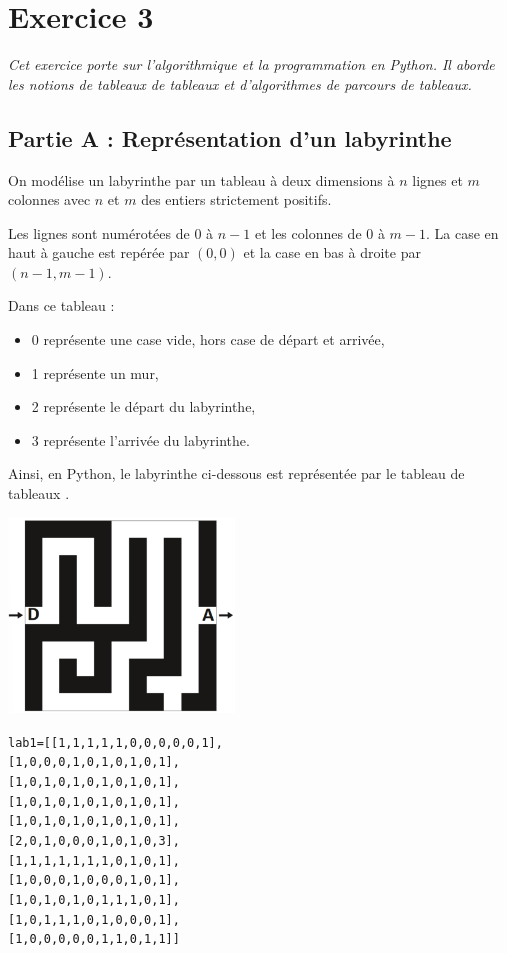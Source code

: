 \documentclass[11pt,a4paper,french,twoside]{PMCours}
\begin{document}
\newpage
\section*{Exercice 3}
\emph{Cet exercice porte sur l'algorithmique et la programmation en Python. Il aborde les notions
de tableaux de tableaux et d'algorithmes de parcours de tableaux.}

\subsection*{Partie A : Représentation d'un labyrinthe}
On modélise un labyrinthe par un tableau à deux dimensions à $n$ lignes et $m$ colonnes avec $n$ et
$m$ des entiers strictement positifs.

Les lignes sont numérotées de $0$ à $n-1$ et les colonnes de $0$ à $m-1$.
La case en haut à gauche est repérée par $(0,0)$ et la case en bas à droite par $(n-1,m-1)$.

Dans ce tableau :
\begin{itemize}
\item 0 représente une case vide, hors case de départ et arrivée,
\item 1 représente un mur,
\item 2 représente le départ du labyrinthe,
\item 3 représente l'arrivée du labyrinthe.
\end{itemize}
Ainsi, en Python, le labyrinthe ci-dessous est représentée par le tableau de tableaux .

\begin{multicols}{2}
\includegraphics[width=6cm]{BacBlanc2Sujet1_NSI2122-img1.png}

\begin{alltt}
lab1 = [[1, 1, 1, 1, 1, 0, 0, 0, 0, 0, 1],
        [1, 0, 0, 0, 1, 0, 1, 0, 1, 0, 1],
        [1, 0, 1, 0, 1, 0, 1, 0, 1, 0, 1],
        [1, 0, 1, 0, 1, 0, 1, 0, 1, 0, 1],
        [1, 0, 1, 0, 1, 0, 1, 0, 1, 0, 1],
        [2, 0, 1, 0, 0, 0, 1, 0, 1, 0, 3],
        [1, 1, 1, 1, 1, 1, 1, 0, 1, 0, 1],
        [1, 0, 0, 0, 1, 0, 0, 0, 1, 0, 1],
        [1, 0, 1, 0, 1, 0, 1, 1, 1, 0, 1],
        [1, 0, 1, 1, 1, 0, 1, 0, 0, 0, 1],
        [1, 0, 0, 0, 0, 0, 1, 1, 0, 1, 1]]
\end{alltt}
\end{multicols}
\end{document}
